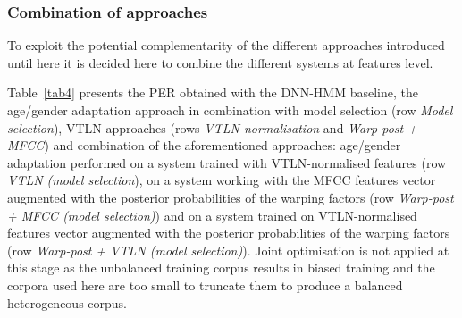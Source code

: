 \documentclass{nle}
\begin{document}
\subsubsection{Combination of approaches}

To exploit the potential complementarity of  the different approaches introduced  until here  it is  decided here  to combine  the different systems at features level.

Table~\ref{tab4} presents the PER obtained with the DNN-HMM baseline, the age/gender adaptation approach in combination with model selection (row {\em Model selection}), VTLN approaches (rows {\em VTLN-normalisation} and {\em Warp-post + MFCC}) and combination of the aforementioned approaches: age/gender adaptation performed on a system trained with VTLN-normalised features (row {\em VTLN (model selection}), on a system working with the MFCC features vector augmented with the posterior probabilities of the warping factors (row {\em Warp-post + MFCC (model selection)}) and on a system trained on VTLN-normalised features vector augmented with the posterior probabilities of the warping factors (row {\em Warp-post + VTLN (model selection)}). Joint optimisation is not applied at this stage as the unbalanced training corpus results in biased training and the corpora used here are too small to truncate them to produce a balanced heterogeneous corpus. 
\end{document}
